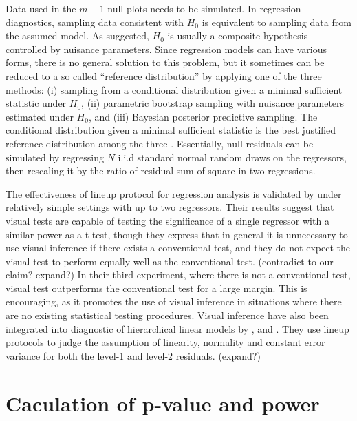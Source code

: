 \documentclass[]{interact}
\theoremstyle{plain}%
\theoremstyle{definition}
\theoremstyle{remark}
\begin{document}
Data used in the \(m - 1\) null plots needs to be simulated. In
regression diagnostics, sampling data consistent with \(H_0\) is
equivalent to sampling data from the assumed model. As
\citet{buja_statistical_2009} suggested, \(H_0\) is usually a composite
hypothesis controlled by nuisance parameters. Since regression models
can have various forms, there is no general solution to this problem,
but it sometimes can be reduced to a so called ``reference
distribution'' by applying one of the three methods: (i) sampling from a
conditional distribution given a minimal sufficient statistic under
\(H_0\), (ii) parametric bootstrap sampling with nuisance parameters
estimated under \(H_0\), and (iii) Bayesian posterior predictive
sampling. The conditional distribution given a minimal sufficient
statistic is the best justified reference distribution among the three
\citep{buja_statistical_2009}. Essentially, null residuals can be
simulated by regressing \(N\) i.i.d standard normal random draws on the
regressors, then rescaling it by the ratio of residual sum of square in
two regressions.

The effectiveness of lineup protocol for regression analysis is
validated by \citet{majumder_validation_2013} under relatively simple
settings with up to two regressors. Their results suggest that visual
tests are capable of testing the significance of a single regressor with
a similar power as a t-test, though they express that in general it is
unnecessary to use visual inference if there exists a conventional test,
and they do not expect the visual test to perform equally well as the
conventional test. (contradict to our claim? expand?) In their third
experiment, where there is not a conventional test, visual test
outperforms the conventional test for a large margin. This is
encouraging, as it promotes the use of visual inference in situations
where there are no existing statistical testing procedures. Visual
inference have also been integrated into diagnostic of hierarchical
linear models by \citet{loy2013diagnostic}, \citet{loy2014hlmdiag} and
\citet{loy2015you}. They use lineup protocols to judge the assumption of
linearity, normality and constant error variance for both the level-1
and level-2 residuals. (expand?)

\hypertarget{caculation-of-p-value-and-power}{%
\section{Caculation of p-value and
power}\label{caculation-of-p-value-and-power}}
\end{document}
